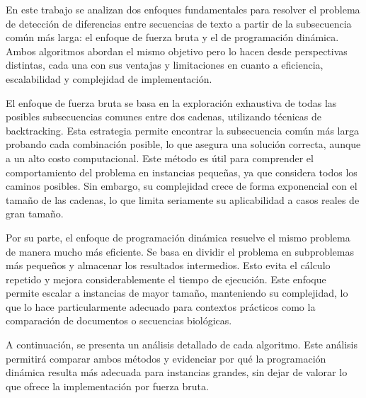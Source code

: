 En este trabajo se analizan dos enfoques fundamentales para resolver el problema de detección de diferencias entre secuencias de texto a partir de la subsecuencia común más larga: el enfoque de fuerza bruta y el de programación dinámica. Ambos algoritmos abordan el mismo objetivo pero lo hacen desde perspectivas distintas, cada una con sus ventajas y limitaciones en cuanto a eficiencia, escalabilidad y complejidad de implementación.

\vspace{0.5 cm}

El enfoque de fuerza bruta se basa en la exploración exhaustiva de todas las posibles subsecuencias comunes entre dos cadenas, utilizando técnicas de backtracking. Esta estrategia permite encontrar la subsecuencia común más larga probando cada combinación posible, lo que asegura una solución correcta, aunque a un alto costo computacional. Este método es útil para comprender el comportamiento del problema en instancias pequeñas, ya que considera todos los caminos posibles. Sin embargo, su complejidad crece de forma exponencial con el tamaño de las cadenas, lo que limita seriamente su aplicabilidad a casos reales de gran tamaño.

\vspace{0.5 cm}

Por su parte, el enfoque de programación dinámica resuelve el mismo problema de manera mucho más eficiente. Se basa en dividir el problema en subproblemas más pequeños y almacenar los resultados intermedios. Esto evita el cálculo repetido y mejora considerablemente el tiempo de ejecución. Este enfoque permite escalar a instancias de mayor tamaño, manteniendo su complejidad, lo que lo hace particularmente adecuado para contextos prácticos como la comparación de documentos o secuencias biológicas.

\vspace{0.5 cm}

A continuación, se presenta un análisis detallado de cada algoritmo. Este análisis permitirá comparar ambos métodos y evidenciar por qué la programación dinámica resulta más adecuada para instancias grandes, sin dejar de valorar lo que ofrece la implementación por fuerza bruta.